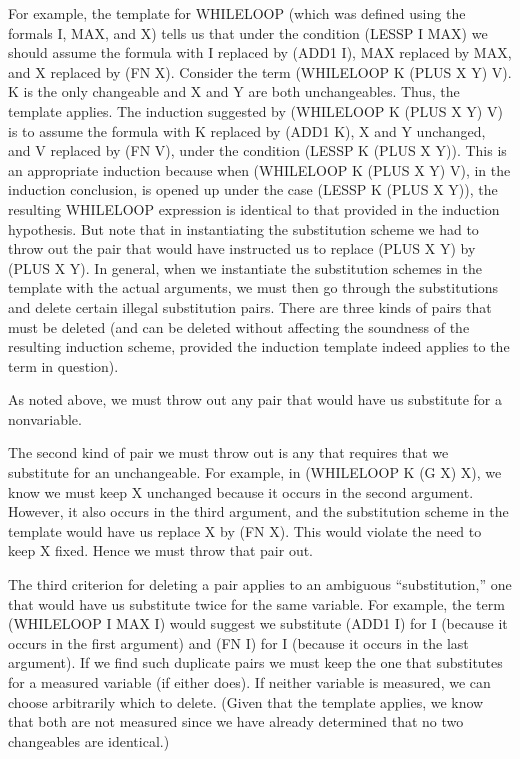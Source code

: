 \documentclass[10pt]{book}
\begin{document}
For example, the template for WHILELOOP (which was defined
using the formals I, MAX, and X) tells us that under the
condition (LESSP I MAX) we should assume the formula with I
replaced by (ADD1 I), MAX replaced by MAX, and X replaced by
(FN X).  Consider the term (WHILELOOP K (PLUS X Y) V).  K is
the only changeable and X and Y are both unchangeables.
Thus, the template applies.  The induction suggested by
(WHILELOOP K (PLUS X Y) V) is to assume the formula with K
replaced by (ADD1 K), X and Y unchanged, and V replaced by
(FN V), under the condition (LESSP K (PLUS X Y)).  This is
an appropriate induction because when (WHILELOOP K (PLUS X
Y) V), in the induction conclusion, is opened up under the
case (LESSP K (PLUS X Y)), the resulting WHILELOOP
expression is identical to that provided in the induction
hypothesis.  But note that in instantiating the substitution
scheme we had to throw out the pair that would have
instructed us to replace (PLUS X Y) by (PLUS X Y).  In
general, when we instantiate the substitution schemes in the
template with the actual arguments, we must then go through
the substitutions and delete certain illegal substitution
pairs.  There are three kinds of pairs that must be deleted
(and can be deleted without affecting the soundness of the
resulting induction scheme, provided the induction template
indeed applies to the term in question). 

As noted above, we must throw out any pair that would have us
substitute for a nonvariable.

The second kind of pair we must throw out is any that requires that
we substitute for an unchangeable.  For example, in (WHILELOOP K (G X) X),
we know we must keep X unchanged because it occurs in the second argument.
However, it also occurs in the third argument, and the substitution scheme
in the template would have us replace X by (FN X).  This would violate the
need to keep X fixed.  Hence we must throw that pair out.

The third criterion for deleting a pair applies to an ambiguous
``substitution,'' one that would have us substitute twice for the same
variable.  For example, the term (WHILELOOP I MAX I) would suggest we
substitute (ADD1 I) for I (because it occurs in the first argument) and
(FN I) for I (because it occurs in the last argument).  If we find such
duplicate pairs we must keep the one that substitutes for a measured
variable (if either does).  If neither variable is measured, we
can choose arbitrarily which to delete. (Given that the template applies, we know that both are not
measured since we have already determined that no two changeables are identical.)
\end{document}
